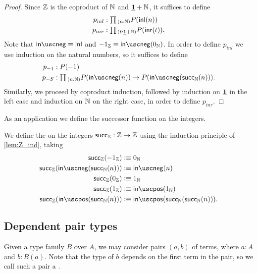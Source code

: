 \begin{proof}
  Since ${\mathbb{Z}}$ is the coproduct of ${\mathbb{N}}$ and $\underline{\mathbf{1}}+{\mathbb{N}}$, it suffices to define
  \begin{align*}
    p_{inl} & : \prd{n:\N}P(\inl(n)) \\
    p_{inr} & : \prd{t:\unit+\N}P(\inr(t)).
  \end{align*}
  Note that $\inneg\jdeq\inl$ and $-1_\Z\jdeq \inneg(\zeroN)$. In order to define $p_{inl}$ we use induction on the natural numbers, so it suffices to define
  \begin{align*}
    p_{-1} & : P(-1) \\
    p_{-S} & : \prd{n:\N} P(\inneg(n))\to P(\inneg(\succN(n))).
  \end{align*}
  Similarly, we proceed by coproduct induction, followed by induction on $\underline{\mathbf{1}}$ in the left case and induction on ${\mathbb{N}}$ on the right case, in order to define $p_{inr}$. 
\end{proof}

As an application we define the successor function on the integers.

\begin{defn}
We define the  on the integers $\mathsf{succ}_{{\mathbb{Z}}}:{\mathbb{Z}}\to{\mathbb{Z}}$ using the induction principle of \cref{lem:Z_ind}, taking
\begin{align*}
\succZ(-1_\Z) & \defeq 0_\N \\
\succZ(\inneg(\succN(n))) & \defeq \inneg(n) \\
\succZ(0_\Z) & \defeq 1_\N \\
\succZ(1_\Z) & \defeq \inpos(1_\N) \\
\succZ(\inpos(\succN(n))) & \defeq \inpos(\succN(\succN(n))).
\end{align*}
\end{defn}

\subsection{Dependent pair types}


Given a type family $B$ over $A$, we may consider pairs $(a,b)$ of terms, where $a:A$ and $b:B(a)$. Note that the type of $b$ depends on the first term in the pair, so we call such a pair a .

